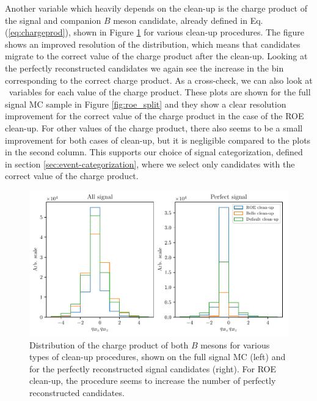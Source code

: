 Another variable which heavily depends on the clean-up is the charge product of the signal and companion $B$ meson candidate, already defined in Eq. (\ref{eq:chargeprod}), shown in Figure \ref{fig:roe_chargeproduct} for various clean-up procedures. The figure shows an improved resolution of the distribution, which means that candidates migrate to the correct value of the charge product after the clean-up. Looking at the perfectly reconstructed candidates we again see the increase in the bin corresponding to the correct charge product. As a cross-check, we can also look at \vars~variables for each value of the charge product. These plots are shown for the full signal MC sample in Figure \ref{fig:roe_split} and they show a clear resolution improvement for the correct value of the charge product in the case of the ROE clean-up. For other values of the charge product, there also seems to be a small improvement for both cases of clean-up, but it is negligible compared to the plots in the second column. This supports our choice of signal categorization, defined in section \ref{sec:event-categorization}, where we select only candidates with the correct value of the charge product.

\begin{figure}[H]
	\centering
	\captionsetup{width=0.8\linewidth}
	\includegraphics[width=\linewidth]{fig/roe_chargeprod}
	\caption{Distribution of the charge product of both $B$ mesons for various types of clean-up procedures, shown on the full signal MC (left) and for the perfectly reconstructed signal candidates (right). For ROE clean-up, the procedure seems to increase the number of perfectly reconstructed candidates.}
	\label{fig:roe_chargeproduct}
\end{figure}


